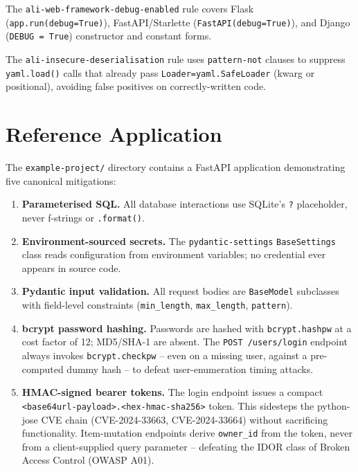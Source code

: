 \documentclass[conference]{IEEEtran}
\begin{document}
The \texttt{ali-web-framework-debug-enabled} rule covers Flask
(\texttt{app.run(debug=True)}), FastAPI/Starlette (\texttt{FastAPI(debug=True)}),
and Django (\texttt{DEBUG = True}) constructor and constant forms.

The \texttt{ali-insecure-deserialisation} rule uses \texttt{pattern-not}
clauses to suppress \texttt{yaml.load()} calls that already pass
\texttt{Loader=yaml.SafeLoader} (kwarg or positional), avoiding false
positives on correctly-written code.

\section{Reference Application}
\label{sec:example}

The \texttt{example-project/} directory contains a FastAPI application
demonstrating five canonical mitigations:

\begin{enumerate}
  \item \textbf{Parameterised SQL.} All database interactions use SQLite's
        \texttt{?} placeholder, never f-strings or \texttt{.format()}.

  \item \textbf{Environment-sourced secrets.} The \texttt{pydantic-settings}
        \texttt{BaseSettings} class reads configuration from environment
        variables; no credential ever appears in source code.

  \item \textbf{Pydantic input validation.} All request bodies are
        \texttt{BaseModel} subclasses with field-level constraints
        (\texttt{min\_length}, \texttt{max\_length}, \texttt{pattern}).

  \item \textbf{bcrypt password hashing.} Passwords are hashed with
        \texttt{bcrypt.hashpw} at a cost factor of 12; MD5/SHA-1 are absent.
        The \texttt{POST /users/login} endpoint always invokes
        \texttt{bcrypt.checkpw} -- even on a missing user, against a
        pre-computed dummy hash -- to defeat user-enumeration timing attacks.

  \item \textbf{HMAC-signed bearer tokens.} The login endpoint issues a
        compact \texttt{<base64url-payload>.<hex-hmac-sha256>} token. This
        sidesteps the python-jose CVE chain (CVE-2024-33663,
        CVE-2024-33664) without sacrificing functionality. Item-mutation
        endpoints derive \texttt{owner\_id} from the token, never from a
        client-supplied query parameter -- defeating the IDOR class of
        Broken Access Control (OWASP A01).
\end{enumerate}
\end{document}
